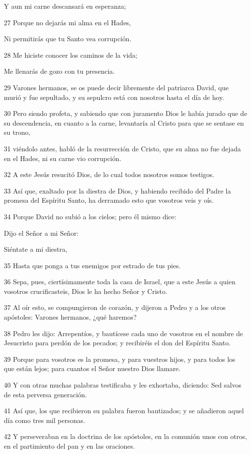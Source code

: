 \par Y aun mi carne descansará en esperanza;
\par 27 Porque no dejarás mi alma en el Hades,
\par Ni permitirás que tu Santo vea corrupción.
\par 28 Me hiciste conocer los caminos de la vida;
\par Me llenarás de gozo con tu presencia.
\par 29 Varones hermanos, se os puede decir libremente del patriarca David, que murió y fue sepultado, y su sepulcro está con nosotros hasta el día de hoy.
\par 30 Pero siendo profeta, y sabiendo que con juramento Dios le había jurado que de su descendencia, en cuanto a la carne, levantaría al Cristo para que se sentase en su trono,
\par 31 viéndolo antes, habló de la resurrección de Cristo, que su alma no fue dejada en el Hades, ni su carne vio corrupción.
\par 32 A este Jesús resucitó Dios, de lo cual todos nosotros somos testigos.
\par 33 Así que, exaltado por la diestra de Dios, y habiendo recibido del Padre la promesa del Espíritu Santo, ha derramado esto que vosotros veis y oís.
\par 34 Porque David no subió a los cielos; pero él mismo dice:
\par Dijo el Señor a mi Señor:
\par Siéntate a mi diestra,
\par 35 Hasta que ponga a tus enemigos por estrado de tus pies.
\par 36 Sepa, pues, ciertísimamente toda la casa de Israel, que a este Jesús a quien vosotros crucificasteis, Dios le ha hecho Señor y Cristo.
\par 37 Al oír esto, se compungieron de corazón, y dijeron a Pedro y a los otros apóstoles: Varones hermanos, ¿qué haremos?
\par 38 Pedro les dijo: Arrepentíos, y bautícese cada uno de vosotros en el nombre de Jesucristo para perdón de los pecados; y recibiréis el don del Espíritu Santo.
\par 39 Porque para vosotros es la promesa, y para vuestros hijos, y para todos los que están lejos; para cuantos el Señor nuestro Dios llamare.
\par 40 Y con otras muchas palabras testificaba y les exhortaba, diciendo: Sed salvos de esta perversa generación.
\par 41 Así que, los que recibieron su palabra fueron bautizados; y se añadieron aquel día como tres mil personas.
\par 42 Y perseveraban en la doctrina de los apóstoles, en la comunión unos con otros, en el partimiento del pan y en las oraciones.


